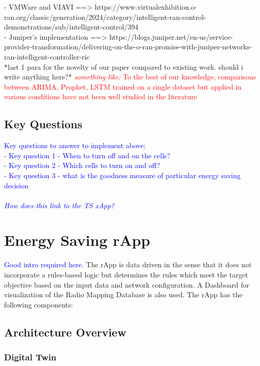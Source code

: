 \documentclass[conference]{IEEEtran}
\begin{document}
- VMWare and VIAVI ==> https://www.virtualexhibition.o-ran.org/classic/generation/2024/category/intelligent-ran-control-demonstrations/sub/intelligent-control/394 \\

- Juniper's implementation ==> https://blogs.juniper.net/en-us/service-provider-transformation/delivering-on-the-o-ran-promise-with-juniper-networks-ran-intelligent-controller-ric \\

*last 1 para for the novelty of our paper compared to existing work. should i write anything here?* \textcolor{red}{\textit{something like: } To the best of our knowledge, comparisons between ARIMA, Prophet, LSTM trained on a single dataset but applied in various conditions have not been well studied in the literature}

\subsection{Key Questions}
\textcolor{blue}{
Key questions to answer to implement above: \\
- Key question 1 - When to turn off and on the cells? \\
- Key question 2 - Which cells to turn on and off? \\
- Key question 3 - what is the goodness measure of particular energy saving decision \\
\\
\textit{How does this link to the TS xApp?}
}

\section{Energy Saving rApp}

\textcolor{blue}{Good intro required here}. The rApp is data driven in the sense that it does not incorporate a rules-based logic but determines the rules which meet the target objective based on the input data and network configuration. A Dashboard for visualization of the Radio Mapping Database is also used. The rApp has the following components: \\

\subsection{Architecture Overview}

\subsubsection{Digital Twin}
\end{document}
